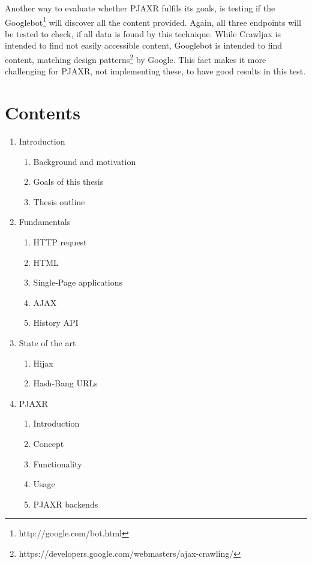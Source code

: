 \documentclass[f,bachelor,binding,twoside,palatino]{WeSTthesis}
\def \ajax {AJAX}
\def \pjaxr {PJAXR}
\def \httpRequest {HTTP request}
\begin{document}
  Another way to evaluate whether \pjaxr{} fulfils its goals, is testing if the Googlebot\footnote{http://google.com/bot.html} will discover all the content provided.
  Again, all three endpoints will be tested to check, if all data is found by this technique.
  While Crawljax is intended to find not easily accessible content, Googlebot is intended to find content, matching design patterns\footnote{https://developers.google.com/webmasters/ajax-crawling/} by Google. This fact makes it more challenging for \pjaxr{}, not implementing these, to have good results in this test.

\section{Contents}

\begin{enumerate}
  \item Introduction
  \begin{enumerate}[label*=\arabic*.]
    \item Background and motivation
    \item Goals of this thesis
    \item Thesis outline
  \end{enumerate}
  \item Fundamentals
  \begin{enumerate}[label*=\arabic*.]
    \item \httpRequest{}
    \item HTML
    \item Single-Page applications
    \item \ajax{}
    \item History API
  \end{enumerate}
  \item State of the art
  \begin{enumerate}[label*=\arabic*.]
    \item Hijax
    \item Hash-Bang URLs
  \end{enumerate}
  \item \pjaxr{}
  \begin{enumerate}[label*=\arabic*.]
    \item Introduction
    \item Concept
    \item Functionality
    \item Usage
    \item \pjaxr{} backends
  \end{enumerate}

\end{enumerate}
\end{document}
